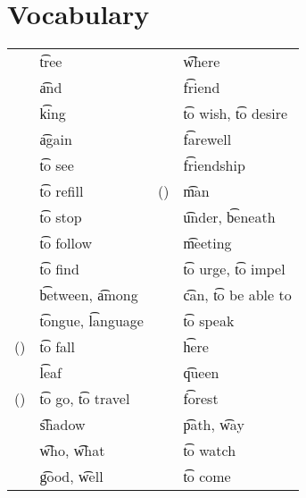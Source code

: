 \section{Vocabulary}
\begin{center}
\begin{tabular}{ll|ll}
\toprule
\q{}   & \t{tree}       & \q{}    & \t{where} \\
\q{}   & \t{and}        & \q{}    & \t{friend} \\
\q{}  & \t{king}       & \q{}   & \t{to wish}, \t{to desire} \\
\q{}   & \t{again}      & \q{} & \t{farewell} \\
\q{}  & \t{to see}     & \q{}   & \t{friendship} \\
\q{} & \t{to refill}  & \q{} (\q{}) & \t{man} \\
\q{} & \t{to stop}    & \q{}     & \t{under}, \t{beneath} \\
\q{}  & \t{to follow}  & \q{}   & \t{meeting} \\
\q{}  & \t{to find}    & \q{}   & \t{to urge}, \t{to impel} \\
\q{}   & \t{between}, \t{among}     & \q{}   & \t{can}, \t{to be able
to} \\
\q{}   & \t{tongue}, \t{language}   & \q{}   & \t{to speak} \\
\q{} (\q{})  & \t{to fall} & \q{}   & \t{here} \\
\q{}   & \t{leaf}       & \q{}   & \t{queen} \\
\q{}  (\q{}) & \t{to go}, \t{to travel} & \q{} & \t{forest} \\
\q{} & \t{shadow}     & \q{}    & \t{path}, \t{way} \\
\q{}   & \t{who}, \t{what} & \q{}   & \t{to watch} \\
\q{}  & \t{good}, \t{well}& \q{}   & \t{to come} \\
\bottomrule
\end{tabular}
\end{center}

\section{}
